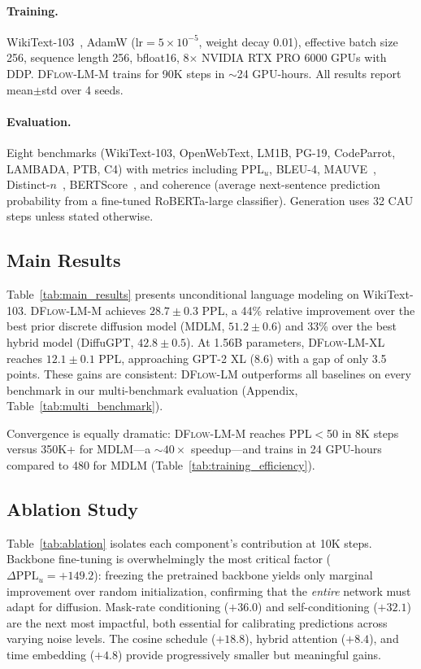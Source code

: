\documentclass{article}
\newcommand{\ours}{\textsc{DFlow-LM}}
\begin{document}
\paragraph{Training.}
WikiText-103~\citep{merity2017pointer}, AdamW ($\text{lr}{=}5{\times}10^{-5}$, weight decay 0.01), effective batch size 256, sequence length 256, bfloat16, 8$\times$ NVIDIA RTX PRO 6000 GPUs with DDP.
\ours{}-M trains for 90K steps in ${\sim}$24 GPU-hours. All results report mean${\pm}$std over 4 seeds.

\paragraph{Evaluation.}
Eight benchmarks (WikiText-103, OpenWebText, LM1B, PG-19, CodeParrot, LAMBADA, PTB, C4) with metrics including PPL$_u$, BLEU-4, MAUVE~\citep{pillutla2021mauve}, Distinct-$n$~\citep{li2016diversity}, BERTScore~\citep{zhang2020bertscore}, and coherence (average next-sentence prediction probability from a fine-tuned RoBERTa-large classifier).
Generation uses 32 CAU steps unless stated otherwise.



\subsection{Main Results}
\label{sec:exp:main}

Table~\ref{tab:main_results} presents unconditional language modeling on WikiText-103.
\ours{}-M achieves $28.7{\pm}0.3$ PPL, a 44\% relative improvement over the best prior discrete diffusion model (MDLM, $51.2{\pm}0.6$) and 33\% over the best hybrid model (DiffuGPT, $42.8{\pm}0.5$).
At 1.56B parameters, \ours{}-XL reaches $12.1{\pm}0.1$ PPL, approaching GPT-2 XL (8.6) with a gap of only 3.5 points.
These gains are consistent: \ours{} outperforms all baselines on every benchmark in our multi-benchmark evaluation (Appendix, Table~\ref{tab:multi_benchmark}).

Convergence is equally dramatic: \ours{}-M reaches PPL${<}$50 in 8K steps versus 350K+ for MDLM---a ${\sim}40{\times}$ speedup---and trains in 24 GPU-hours compared to 480 for MDLM (Table~\ref{tab:training_efficiency}).

\subsection{Ablation Study}
\label{sec:exp:ablation}

Table~\ref{tab:ablation} isolates each component's contribution at 10K steps.
Backbone fine-tuning is overwhelmingly the most critical factor ($\Delta\text{PPL}_u{=}+149.2$): freezing the pretrained backbone yields only marginal improvement over random initialization, confirming that the \emph{entire} network must adapt for diffusion.
Mask-rate conditioning ($+36.0$) and self-conditioning ($+32.1$) are the next most impactful, both essential for calibrating predictions across varying noise levels.
The cosine schedule ($+18.8$), hybrid attention ($+8.4$), and time embedding ($+4.8$) provide progressively smaller but meaningful gains.
\end{document}
